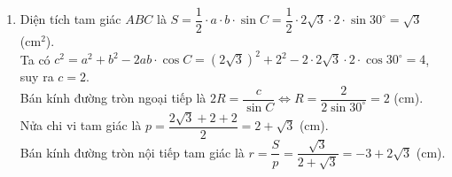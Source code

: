 \begin{bt}
{\begin{enumerate}
			Áp dụng định lý sin cho tam giác $ AHK $, ta có
			$$\dfrac{AK}{\sin\widehat{AHK}}=\dfrac{HK}{\sin\widehat{HAK}}\Leftrightarrow\dfrac{AK}{\sin 45^\circ}=\dfrac{380}{\sin 85^\circ}\Leftrightarrow AK\approx 270 \text{ m}. $$ 
			\item Diện tích tam giác $ ABC $ là $ S=\dfrac{1}{2}\cdot a\cdot b\cdot\sin C=\dfrac{1}{2}\cdot 2\sqrt{3}\cdot 2\cdot\sin 30^\circ=\sqrt{3}$ (cm$^2$).\\
			Ta có $ c^2=a^2+b^2-2ab\cdot\cos C=(2\sqrt{3})^2+2^2-2\cdot 2\sqrt{3}\cdot 2\cdot\cos 30^\circ=4 $, suy ra $ c=2 $.\\
			Bán kính đường tròn ngoại tiếp là $ 2R=\dfrac{c}{\sin C}\Leftrightarrow R=\dfrac{2}{2\sin 30^\circ}=2 $ (cm).\\
			Nửa chi vi tam giác là $ p=\dfrac{2\sqrt{3}+2+2}{2}=2+\sqrt{3}$ (cm).\\
			Bán kính đường tròn nội tiếp tam giác là $ r=\dfrac{S}{p}=\dfrac{\sqrt{3}}{2+\sqrt{3}}=-3+2\sqrt{3}$ (cm).
		\end{enumerate}
	}
\end{bt}


